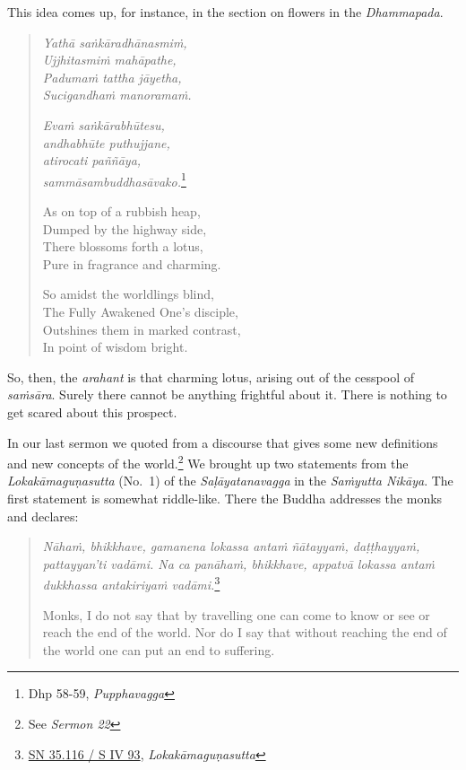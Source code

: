 This idea comes up, for instance, in the section on flowers in the \emph{Dhammapada}.

\clearpage

\begin{quote}
\emph{Yathā saṅkāradhānasmiṁ,}\\
\emph{Ujjhitasmiṁ mahāpathe,}\\
\emph{Padumaṁ tattha jāyetha,}\\
\emph{Sucigandhaṁ manoramaṁ.}

\emph{Evaṁ saṅkārabhūtesu,}\\
\emph{andhabhūte puthujjane,}\\
\emph{atirocati paññāya,}\\
\emph{sammāsambuddhasāvako.}\footnote{Dhp 58-59, \emph{Pupphavagga}}

As on top of a rubbish heap,\\
Dumped by the highway side,\\
There blossoms forth a lotus,\\
Pure in fragrance and charming.

So amidst the worldlings blind,\\
The Fully Awakened One's disciple,\\
Outshines them in marked contrast,\\
In point of wisdom bright.
\end{quote}

So, then, the \emph{arahant} is that charming lotus, arising out of the cesspool of \emph{saṁsāra}. Surely there cannot be anything frightful about it. There is nothing to get scared about this prospect.

In our last sermon we quoted from a discourse that gives some new definitions and new concepts of the world.\footnote{See \emph{Sermon 22}} We brought up two statements from the \emph{Lokakāmaguṇasutta} (No.~1) of the \emph{Saḷāyatanavagga} in the \emph{Saṁyutta Nikāya}. The first statement is somewhat riddle-like. There the Buddha addresses the monks and declares:

\begin{quote}
\emph{Nāhaṁ, bhikkhave, gamanena lokassa antaṁ ñātayyaṁ, daṭṭhayyaṁ, pattayyan'ti vadāmi. Na ca panāhaṁ, bhikkhave, appatvā lokassa antaṁ dukkhassa antakiriyaṁ vadāmi.}\footnote{\href{https://suttacentral.net/sn35.116/pli/ms}{SN 35.116 / S IV 93}, \emph{Lokakāmaguṇasutta}}

Monks, I do not say that by travelling one can come to know or see or reach the end of the world. Nor do I say that without reaching the end of the world one can put an end to suffering.
\end{quote}

